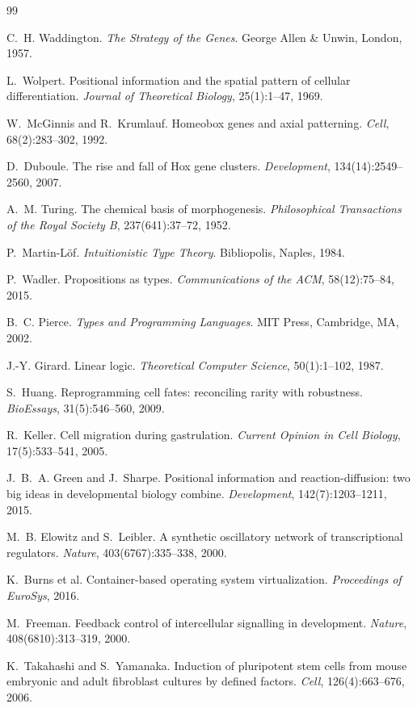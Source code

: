 \documentclass[12pt,a4paper]{article}
\begin{document}
\begin{thebibliography}{99}

C.~H. Waddington.
\newblock \emph{The Strategy of the Genes}.
\newblock George Allen \& Unwin, London, 1957.

L.~Wolpert.
\newblock Positional information and the spatial pattern of cellular
  differentiation.
\newblock \emph{Journal of Theoretical Biology}, 25(1):1--47, 1969.

W.~McGinnis and R.~Krumlauf.
\newblock Homeobox genes and axial patterning.
\newblock \emph{Cell}, 68(2):283--302, 1992.

D.~Duboule.
\newblock The rise and fall of Hox gene clusters.
\newblock \emph{Development}, 134(14):2549--2560, 2007.

A.~M. Turing.
\newblock The chemical basis of morphogenesis.
\newblock \emph{Philosophical Transactions of the Royal Society B},
  237(641):37--72, 1952.

P.~Martin-L\"of.
\newblock \emph{Intuitionistic Type Theory}.
\newblock Bibliopolis, Naples, 1984.

P.~Wadler.
\newblock Propositions as types.
\newblock \emph{Communications of the ACM}, 58(12):75--84, 2015.

B.~C. Pierce.
\newblock \emph{Types and Programming Languages}.
\newblock MIT Press, Cambridge, MA, 2002.

J.-Y. Girard.
\newblock Linear logic.
\newblock \emph{Theoretical Computer Science}, 50(1):1--102, 1987.

S.~Huang.
\newblock Reprogramming cell fates: reconciling rarity with
  robustness.
\newblock \emph{BioEssays}, 31(5):546--560, 2009.

R.~Keller.
\newblock Cell migration during gastrulation.
\newblock \emph{Current Opinion in Cell Biology}, 17(5):533--541, 2005.

J.~B.~A. Green and J.~Sharpe.
\newblock Positional information and reaction-diffusion: two big ideas
  in developmental biology combine.
\newblock \emph{Development}, 142(7):1203--1211, 2015.

M.~B. Elowitz and S.~Leibler.
\newblock A synthetic oscillatory network of transcriptional regulators.
\newblock \emph{Nature}, 403(6767):335--338, 2000.

K.~Burns et al.
\newblock Container-based operating system virtualization.
\newblock \emph{Proceedings of EuroSys}, 2016.

M.~Freeman.
\newblock Feedback control of intercellular signalling in development.
\newblock \emph{Nature}, 408(6810):313--319, 2000.

K.~Takahashi and S.~Yamanaka.
\newblock Induction of pluripotent stem cells from mouse embryonic and
  adult fibroblast cultures by defined factors.
\newblock \emph{Cell}, 126(4):663--676, 2006.

\end{thebibliography}
\end{document}
